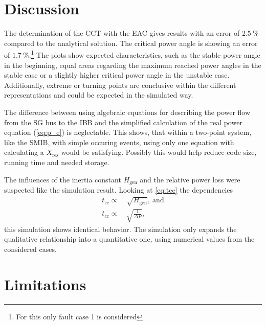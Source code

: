 \section{Discussion}
\label{sec:discussion}

The determination of the \acs{CCT} with the \acs{EAC} gives results with an error of $2.5~\%$ compared to the analytical solution. The critical power angle is showing an error of $1.7~\%$.\footnote{For this only fault case 1 is considered} The plots show expected characteristics, such as the stable power angle in the beginning, equal areas regarding the maximum reached power angles in the stable case or a slightly higher critical power angle in the unstable case. Additionally, extreme or turning points are conclusive within the different representations and could be expected in the simulated way.

The difference between using algebraic equations for describing the power flow from the \acs{SG} bus to the \acs{IBB} and the simplified calculation of the real power equation (\autoref{eq:p_e}) is neglectable. This shows, that within a two-point system, like the \acs{SMIB}, with simple occuring events, using only one equation with calculating a $X_\mathrm{res}$ would be satisfying. Possibly this would help reduce code size, running time and needed storage.

The influences of the inertia constant $H_\mathrm{gen}$ and the relative power loss were suspected like the simulation result. Looking at \autoref{eq:tcc} the dependencies
\begin{align}
        t_\mathrm{cc}\propto&~\sqrt{H_\mathrm{gen}} \nonumber,~\mathrm{and} \\[6pt]
        t_\mathrm{cc}\propto&~\sqrt{\frac{1}{\Delta P}} \nonumber,
\end{align}
this simulation shows identical behavior. The simulation only expands the qualitative relationship into a quantitative one, using numerical values from the considered cases.

\section{Limitations}

